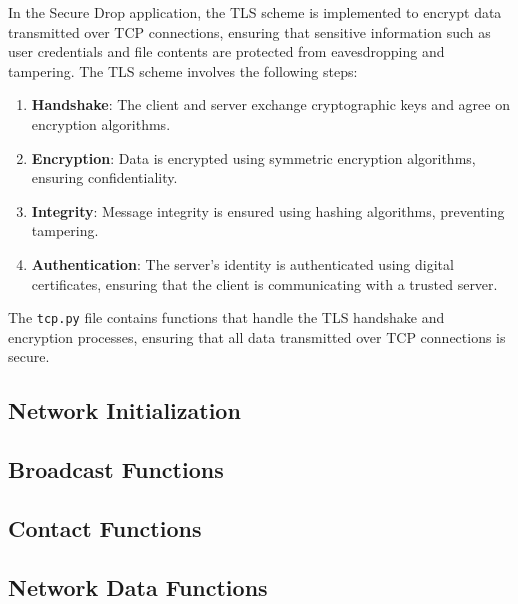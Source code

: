 \documentclass[12pt]{article}
\begin{document}
In the Secure Drop application, the TLS scheme is implemented to encrypt data transmitted over TCP connections, ensuring that sensitive information such as user credentials and file contents are protected from eavesdropping and tampering. The TLS scheme involves the following steps:
\begin{enumerate}
    \item \textbf{Handshake}: The client and server exchange cryptographic keys and agree on encryption algorithms.
    \item \textbf{Encryption}: Data is encrypted using symmetric encryption algorithms, ensuring confidentiality.
    \item \textbf{Integrity}: Message integrity is ensured using hashing algorithms, preventing tampering.
    \item \textbf{Authentication}: The server's identity is authenticated using digital certificates, ensuring that the client is communicating with a trusted server.
\end{enumerate}

The \texttt{tcp.py} file contains functions that handle the TLS handshake and encryption processes, ensuring that all data transmitted over TCP connections is secure.


\subsection{Network Initialization}


\subsection{Broadcast Functions}


\subsection{Contact Functions}


\subsection{Network Data Functions}

\end{document}
